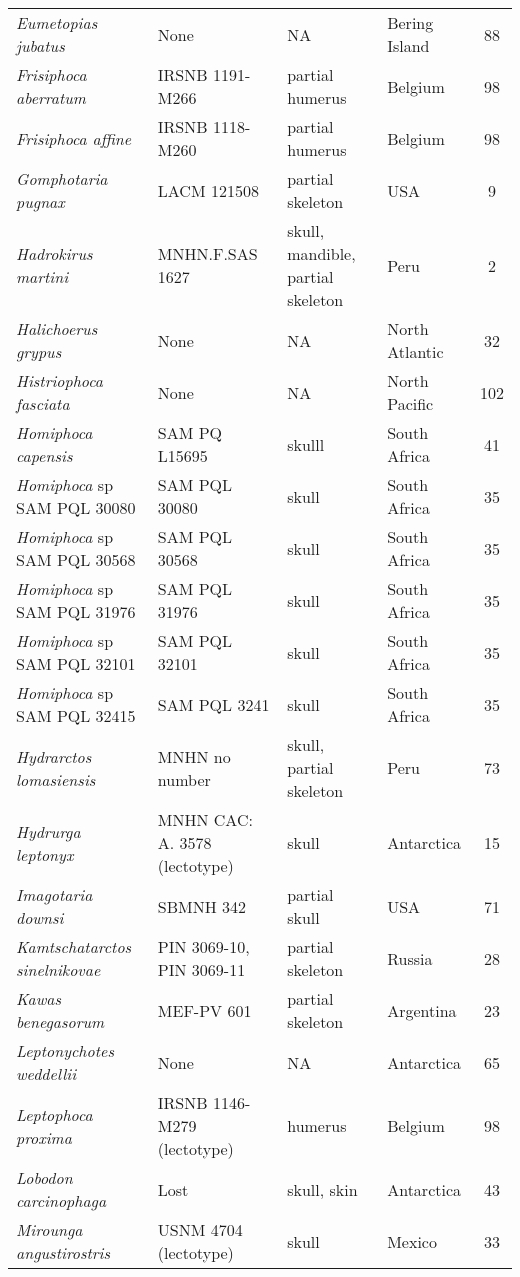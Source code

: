 \begin{longtable}{p{}p{}p{}lc}
\textit{Eumetopias jubatus} &	None & 	NA & 	Bering Island & 88\\
\textit{Frisiphoca aberratum} &	IRSNB 1191-M266 & 	partial humerus & 	Belgium & 98\\
\textit{Frisiphoca affine} &	IRSNB 1118-M260 & 	partial humerus & 	Belgium & 98\\
\textit{Gomphotaria pugnax} &	LACM 121508 & 	partial skeleton & 	USA & 9\\
\textit{Hadrokirus martini} &	MNHN.F.SAS 1627 & 	skull, mandible, partial skeleton & 	Peru & 2\\
\textit{Halichoerus grypus} &	None & 	NA & 	North Atlantic & 32\\
\textit{Histriophoca fasciata} &	None & 	NA & 	North Pacific & 102\\
\textit{Homiphoca capensis} &	SAM PQ L15695 & 	skulll & 	South Africa & 41\\
\textit{Homiphoca} sp SAM PQL 30080	& SAM PQL 30080 & 	skull & 	South Africa & 35\\
\textit{Homiphoca} sp SAM PQL 30568	& SAM PQL 30568 & 	skull & 	South Africa & 35\\
\textit{Homiphoca} sp SAM PQL 31976	& SAM PQL 31976 & 	skull & 	South Africa & 35\\
\textit{Homiphoca} sp SAM PQL 32101	& SAM PQL 32101 & 	skull & 	South Africa & 35\\
\textit{Homiphoca} sp SAM PQL 32415	& SAM PQL 3241 & 	skull & 	South Africa & 35\\
\textit{Hydrarctos lomasiensis} &	MNHN no number & 	skull, partial skeleton & 	Peru & 73\\
\textit{Hydrurga leptonyx} &	MNHN CAC: A. 3578 (lectotype) & 	skull & 	Antarctica & 15\\
\textit{Imagotaria downsi} &	SBMNH 342 & 	partial skull & 	USA & 71\\
\textit{Kamtschatarctos sinelnikovae} &	PIN 3069-10, PIN 3069-11 & 	partial skeleton & 	Russia & 28\\
\textit{Kawas benegasorum} &	MEF-PV 601 & 	partial skeleton & 	Argentina & 23\\
\textit{Leptonychotes weddellii} &	None & 	NA & 	Antarctica & 65\\
\textit{Leptophoca proxima} &	IRSNB 1146-M279 (lectotype) & 	humerus & 	Belgium & 98\\
\textit{Lobodon carcinophaga} &	Lost & 	skull, skin & 	Antarctica & 43\\
\textit{Mirounga angustirostris} &	USNM 4704 (lectotype) & 	skull & 	Mexico & 33\\

\end{longtable}
